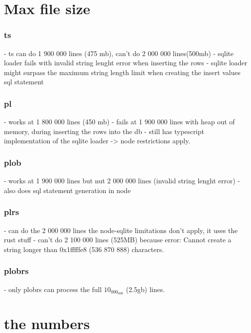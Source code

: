 \section{Max file size}
\subsubsection{ts}
- ts can do 1 900 000 lines (475 mb), can't do 2 000 000 lines(500mb)
- sqlite loader fails with invalid string lenght error when inserting the rows
- sqlite loader might surpass the maximum string length limit when creating the insert values sql statement

\subsubsection{pl}
- works at 1 800 000 lines (450 mb)
- fails at 1 900 000 lines with heap out of memory, during inserting the rows into the db
- still has typescript implementation of the sqlite loader -> node restrictions apply.

\subsubsection{plob}
- works at 1 900 000 lines but nut 2 000 000 lines (invalid string lenght error)
- also does sql statement generation in node

\subsubsection{plrs}
- can do the 2 000 000 lines the node-sqlite limitations don't apply, it uses the rust stuff
- can't do 2 100 000 lines (525MB) because error: Cannot create a string longer than 0x1fffffe8 (536 870 888) characters.

\subsubsection{plobrs}
- only plobrs can process the full $10_000_000$ (2.5gb) lines.

\section{the numbers}

